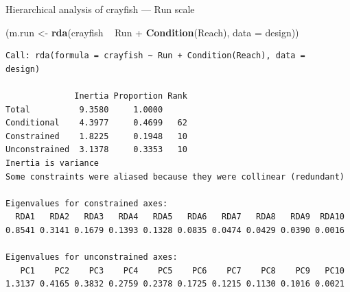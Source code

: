 \documentclass[10pt,ignorenonframetext,compress, aspectratio=169]{beamer}
\newenvironment{Shaded}{\begin{snugshade}}{\end{snugshade}}
\newcommand{\KeywordTok}[1]{\textcolor[rgb]{0.13,0.29,0.53}{\textbf{{#1}}}}
\newcommand{\DataTypeTok}[1]{\textcolor[rgb]{0.13,0.29,0.53}{{#1}}}
\newcommand{\StringTok}[1]{\textcolor[rgb]{0.31,0.60,0.02}{{#1}}}
\newcommand{\NormalTok}[1]{{#1}}
\begin{document}
\begin{frame}[fragile]{Hierarchical analysis of crayfish --- Run scale}

\scriptsize

\begin{Shaded}
\begin{Highlighting}[]
\NormalTok{(m.run <-}\StringTok{ }\KeywordTok{rda}\NormalTok{(crayfish ~}\StringTok{ }\NormalTok{Run +}\StringTok{ }\KeywordTok{Condition}\NormalTok{(Reach), }\DataTypeTok{data =} \NormalTok{design))}
\end{Highlighting}
\end{Shaded}

\begin{verbatim}
Call: rda(formula = crayfish ~ Run + Condition(Reach), data =
design)

              Inertia Proportion Rank
Total          9.3580     1.0000     
Conditional    4.3977     0.4699   62
Constrained    1.8225     0.1948   10
Unconstrained  3.1378     0.3353   10
Inertia is variance 
Some constraints were aliased because they were collinear (redundant)

Eigenvalues for constrained axes:
  RDA1   RDA2   RDA3   RDA4   RDA5   RDA6   RDA7   RDA8   RDA9  RDA10 
0.8541 0.3141 0.1679 0.1393 0.1328 0.0835 0.0474 0.0429 0.0390 0.0016 

Eigenvalues for unconstrained axes:
   PC1    PC2    PC3    PC4    PC5    PC6    PC7    PC8    PC9   PC10 
1.3137 0.4165 0.3832 0.2759 0.2378 0.1725 0.1215 0.1130 0.1016 0.0021 
\end{verbatim}

\normalsize

\end{frame}
\end{document}
